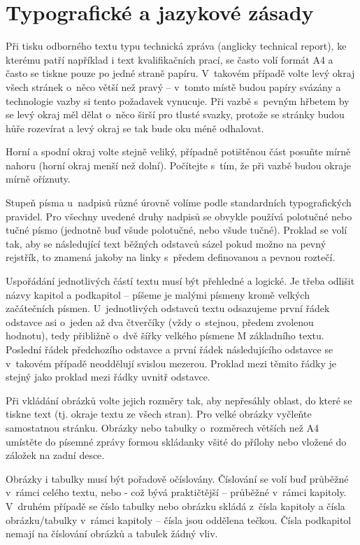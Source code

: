 \chapter{Typografické a jazykové zásady}
Při tisku odborného textu typu technická zpráva (anglicky technical report), ke kterému patří například i text kvalifikačních prací, se často volí formát A4 a často se tiskne pouze po jedné straně papíru.
V~takovém případě volte levý okraj všech stránek o~něco větší než pravý – v~tomto místě budou papíry svázány a technologie vazby si tento požadavek vynucuje.
Při vazbě s~pevným hřbetem by se levý okraj měl dělat o~něco širší pro tlusté svazky, protože se stránky budou hůře rozevírat a levý okraj se tak bude oku méně odhalovat.

Horní a spodní okraj volte stejně veliký, případně potištěnou část posuňte mírně nahoru (horní okraj menší než dolní).
Počítejte s~tím, že při vazbě budou okraje mírně oříznuty.

Stupeň písma u~nadpisů různé úrovně volíme podle standardních typografických pravidel.
Pro všechny uvedené druhy nadpisů se obvykle používá polotučné nebo tučné písmo (jednotně buď všude polotučné, nebo všude tučné).
Proklad se volí tak, aby se následující text běžných odstavců sázel pokud možno na pevný rejstřík, to znamená jakoby na linky s~předem definovanou a pevnou roztečí.

Uspořádání jednotlivých částí textu musí být přehledné a logické.
Je třeba odlišit názvy kapitol a podkapitol – píšeme je malými písmeny kromě velkých začátečních písmen.
U~jednotlivých odstavců textu odsazujeme první řádek odstavce asi o~jeden až dva čtverčíky (vždy o~stejnou, předem zvolenou hodnotu), tedy přibližně o~dvě šířky velkého písmene M základního textu.
Poslední řádek předchozího odstavce a první řádek následujícího odstavce se v~takovém případě neoddělují svislou mezerou.
Proklad mezi těmito řádky je stejný jako proklad mezi řádky uvnitř odstavce.

Při vkládání obrázků volte jejich rozměry tak, aby nepřesáhly oblast, do které se tiskne text (tj.
okraje textu ze všech stran).
Pro velké obrázky vyčleňte samostatnou stránku.
Obrázky nebo tabulky o~rozměrech větších než A4 umístěte do písemné zprávy formou skládanky všité do přílohy nebo vložené do záložek na zadní desce.

Obrázky i tabulky musí být pořadově očíslovány.
Číslování se volí buď průběžné v~rámci celého textu, nebo - což bývá praktičtější – průběžné v~rámci kapitoly.
V~druhém případě se číslo tabulky nebo obrázku skládá z~čísla kapitoly a čísla obrázku/tabulky v~rámci kapitoly – čísla jsou oddělena tečkou.
Čísla podkapitol nemají na číslování obrázků a tabulek žádný vliv.


